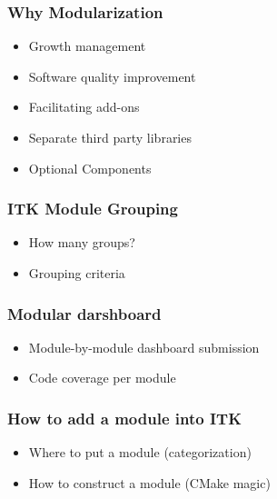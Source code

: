 \begin{frame}
\frametitle{Why Modularization}
\begin{itemize}
\item Growth management
\pause
\item Software quality improvement
\pause
\item Facilitating add-ons
\pause
\item Separate third party libraries
\pause
\item Optional Components
\end{itemize}
\end{frame}

{
\begin{frame}[plain]
\end{frame}
}


{
\begin{frame}[plain]
\end{frame}
}


{
\begin{frame}[plain]
\end{frame}
}


\begin{frame}
\frametitle{ITK Module Grouping}
\begin{itemize}
\item  How many groups?
\pause
\item  Grouping criteria
\pause
\end{itemize}
\end{frame}



\begin{frame}
\frametitle{Modular darshboard }
\begin{itemize}
\item  Module-by-module dashboard submission
\pause
\item  Code coverage per module
\end{itemize}
\end{frame}


\begin{frame}
\frametitle{How to add a module into ITK}
\begin{itemize}
\item Where to put a module (categorization)
\pause
\item How to construct a module (CMake magic)
\end{itemize}
\end{frame}


